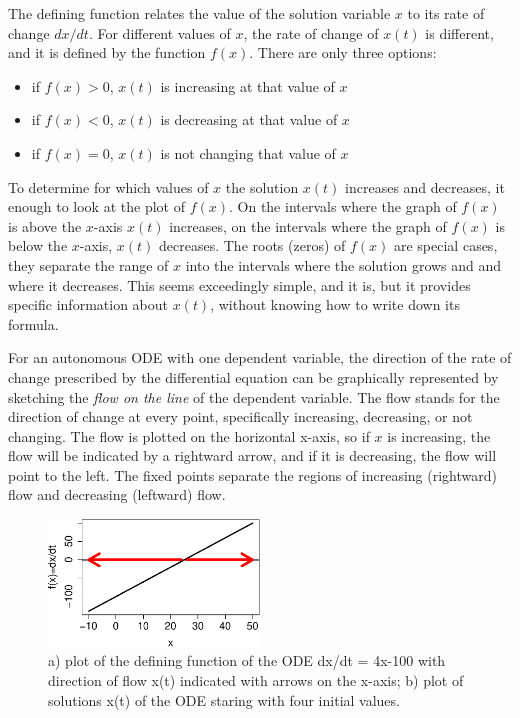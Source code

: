 \documentclass[
  letterpaper,
  DIV=11,
  numbers=noendperiod]{scrreprt}
\begin{document}
The defining function relates the value of the solution variable \(x\)
to its rate of change \(dx/dt\). For different values of \(x\), the rate
of change of \(x(t)\) is different, and it is defined by the function
\(f(x)\). There are only three options:

\begin{itemize}
\item
  if \(f(x) > 0\), \(x(t)\) is increasing at that value of \(x\)
\item
  if \(f(x) < 0\), \(x(t)\) is decreasing at that value of \(x\)
\item
  if \(f(x) = 0\), \(x(t)\) is not changing that value of \(x\)
\end{itemize}

To determine for which values of \(x\) the solution \(x(t)\) increases
and decreases, it enough to look at the plot of \(f(x)\). On the
intervals where the graph of \(f(x)\) is above the \(x\)-axis \(x(t)\)
increases, on the intervals where the graph of \(f(x)\) is below the
\(x\)-axis, \(x(t)\) decreases. The roots (zeros) of \(f(x)\) are
special cases, they separate the range of \(x\) into the intervals where
the solution grows and and where it decreases. This seems exceedingly
simple, and it is, but it provides specific information about \(x(t)\),
without knowing how to write down its formula.

For an autonomous ODE with one dependent variable, the direction of the
rate of change prescribed by the differential equation can be
graphically represented by sketching the
 \emph{flow on the line} of the
dependent variable. The flow stands for the direction of change at every
point, specifically increasing, decreasing, or not changing. The flow is
plotted on the horizontal x-axis, so if \(x\) is increasing, the flow
will be indicated by a rightward arrow, and if it is decreasing, the
flow will point to the left. The fixed points separate the regions of
increasing (rightward) flow and decreasing (leftward) flow.

\begin{figure}

{\centering \includegraphics[width=0.5\textwidth,height=\textheight]{./graph_odes_files/figure-pdf/ch7-flow1-1.pdf}

}

\caption{a) plot of the defining function of the ODE dx/dt = 4x-100 with
direction of flow x(t) indicated with arrows on the x-axis; b) plot of
solutions x(t) of the ODE staring with four initial values.}

\end{figure}
\end{document}
